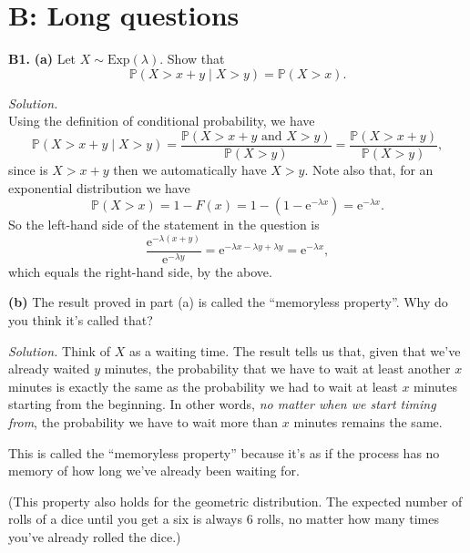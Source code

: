 \documentclass[
  a4paper,
]{book}
\theoremstyle{definition}
\theoremstyle{definition}
\theoremstyle{definition}
\theoremstyle{definition}
\theoremstyle{remark}
\begin{document}
\hypertarget{P5-long}{%
\section*{B: Long questions}\label{P5-long}}

\textbf{B1.}
\textbf{(a)} Let \(X \sim \text{Exp}(\lambda)\). Show that
\[ \mathbb P(X > x + y \mid X > y) = \mathbb P(X > x) . \]

\begin{myanswers}
\emph{Solution.}\\
Using the definition of conditional probability, we have
\[\mathbb P(X > x + y \mid X > y) = \frac{\mathbb P(X > x + y \text{ and } X > y) }{\mathbb P(X > y)}= \frac{\mathbb P(X > x + y ) }{\mathbb P(X > y)} , \]
since is \(X > x + y\) then we automatically have \(X > y\).
Note also that, for an exponential distribution we have
\[ \mathbb P(X > x) = 1 - F(x) = 1 - (1 - \mathrm e^{-\lambda x}) = \mathrm e^{-\lambda x} . \]
So the left-hand side of the statement in the question is
\[ \frac{\mathrm{e}^{-\lambda(x + y)}}{\mathrm{e}^{-\lambda y}} = \mathrm e^{-\lambda x - \lambda y + \lambda y} = \mathrm{e}^{-\lambda x} , \]
which equals the right-hand side, by the above.

\end{myanswers}

\textbf{(b)} The result proved in part (a) is called the ``memoryless property''. Why do you think it's called that?

\begin{myanswers}
\emph{Solution.} Think of \(X\) as a waiting time. The result tells us that, given that we've already waited \(y\) minutes, the probability that we have to wait at least another \(x\) minutes is exactly the same as the probability we had to wait at least \(x\) minutes starting from the beginning. In other words, \emph{no matter when we start timing from}, the probability we have to wait more than \(x\) minutes remains the same.

This is called the ``memoryless property'' because it's as if the process has no memory of how long we've already been waiting for.

(This property also holds for the geometric distribution. The expected number of rolls of a dice until you get a six is always 6 rolls, no matter how many times you've already rolled the dice.)

\end{myanswers}
\end{document}
